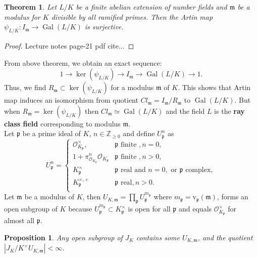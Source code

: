 \documentclass{article}
\newtheorem{proposition}{Proposition}[section]
\theoremstyle{break}
\newtheorem{theorem}{Theorem}[section]
\def\Gal{\mathop{\mathrm{Gal}}\nolimits}
\def\Gal{\mathop{\mathrm{Gal}}\nolimits}
\def\ker{\mathop{\mathrm{ker}}\nolimits}
\def\Gal{\mathop{\mathrm{Gal}}\nolimits}
\def\v{\mathop{\mathrm{v}}\nolimits}
\def\v{\mathrm{v}}
\begin{document}
\begin{theorem}
Let $L/K$ be a finite abelian extension of number fields and $\mathfrak{m}$ be a modulus for $K$ divisible by all ramified primes. Then the Artin map $\psi_{L/K}: I_{\mathfrak{m}} \rightarrow \Gal(L/K)$  is surjective.
\end{theorem}
\begin{proof}
Lecture notes page-21 pdf cite...
\end{proof}
From above theorem, we obtain an exact sequence:
\[1\rightarrow \ker(\psi_{L/K}) \rightarrow I_{\mathfrak{m}}\rightarrow \Gal(L/K) \rightarrow 1 .  \]
Thus, we find $R_{\mathfrak{m}} \subset \ker(\psi_{L/K})$ for a modulus $\mathfrak{m}$ of $K$. This shows that Artin map induces an isomorphism from quotient $ Cl_{\mathfrak{m}} = I_{\mathfrak{m}}/ R_{\mathfrak{m}}$ to $\Gal(L/K)$. But when $R_{\mathfrak{m}} = \ker(\psi_{L/K})$ then $Cl_{\mathfrak{m}}\simeq \Gal(L/K)$ and the field $L$ is the \textbf{ray class field} corresponding to modulus $\mathfrak{m}$.\\
Let $\mathfrak{p}$ be a prime ideal of $K$, $n\in \mathbb{Z}_{\geq 0}$ and define $U_{\mathfrak{p}}^{n}$ as
  \[
 U_{\mathfrak{p}}^{n}  = 
  \begin{cases}
 \mathcal{O}_{K_\mathfrak{p}}^{\times}, & \mathfrak{p} \text{ finite },  n =0,\\
 1+\pi_{\mathcal{O}_{K_\mathfrak{p}}}^{n}\mathcal{O}_{K_\mathfrak{p}} & \mathfrak{p} \text{ finite }, n > 0,\\
 K_{\mathfrak{p}}^{\times} & \mathfrak{p} \text{ real and } n =0 , \text{ or }  \mathfrak{p} \text{ complex},\\
  K_{\mathfrak{p}}^{\times,+}  & \mathfrak{p} \text{ real},  n>0.\\
 \end{cases}
 \]
Let $\mathfrak{m} $ be a modulus  of $K$, then $U_{K, \mathfrak{m}} = \prod_{\mathfrak{p}}^{}U_{\mathfrak{p}}^{m_\mathfrak{p}}$ where $m_{\mathfrak{p}} = \v_{\mathfrak{p}}(\mathfrak{m})$, forms an open subgroup of $K$ because $U_{\mathfrak{p}}^{m_\mathfrak{p}} \subset K_{\mathfrak{p}}^{\times}$ is open for all $\mathfrak{p}$ and equals $\mathcal{O}_{K_\mathfrak{p}}^{\times}$ for almost all $\mathfrak{p}$.
\begin{proposition}
Any open subgroup of $J_{K}$ contains some $U_{K,\mathfrak{m}}$, and the quotient $|J_{K}/ K^{\times}U_{K,\mathfrak{m}}| <\infty$. 
\end{proposition}
\end{document}
